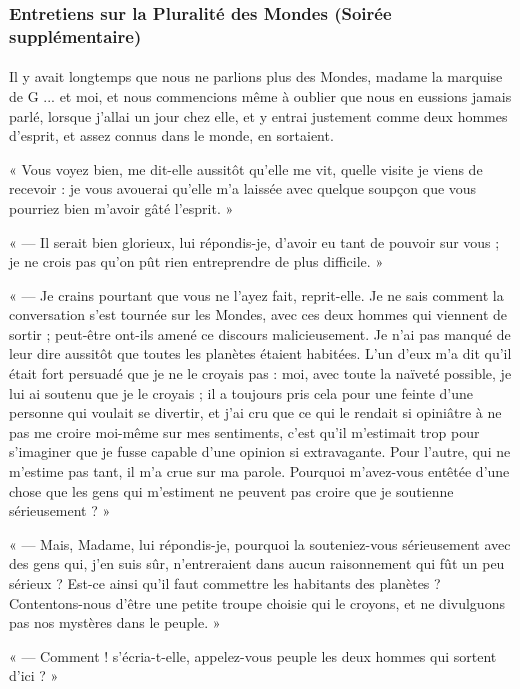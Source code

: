 \documentclass[a4paper, 11pt, oneside]{article}
\begin{document}
\subsubsection{Entretiens sur la Pluralité des Mondes (Soirée supplémentaire)}
\paragraph{}
Il y avait longtemps que nous ne parlions plus des Mondes, madame la marquise de G ... et moi, et nous commencions même à oublier que nous en eussions jamais parlé, lorsque j'allai un jour chez elle, et y entrai justement comme deux hommes d'esprit, et assez connus dans le monde, en sortaient.

« Vous voyez bien, me dit-elle aussitôt qu'elle me vit, quelle visite je viens de recevoir : je vous avouerai qu'elle m'a laissée avec quelque soupçon que vous pourriez bien m'avoir gâté l'esprit. »

« --- Il serait bien glorieux, lui répondis-je, d'avoir eu tant de pouvoir sur vous ; je ne crois pas qu'on pût rien entreprendre de plus difficile. »

« --- Je crains pourtant que vous ne l'ayez fait, reprit-elle. Je ne sais comment la conversation s'est tournée sur les Mondes, avec ces deux hommes qui viennent de sortir ; peut-être ont-ils amené ce discours malicieusement. Je n'ai pas manqué de leur dire aussitôt que toutes les planètes étaient habitées. L'un d'eux m'a dit qu'il était fort persuadé que je ne le croyais pas : moi, avec toute la naïveté possible, je lui ai soutenu que je le croyais ; il a toujours pris cela pour une feinte d'une personne qui voulait se divertir, et j'ai cru que ce qui le rendait si opiniâtre à ne pas me croire moi-même sur mes sentiments, c'est qu'il m'estimait trop pour s'imaginer que je fusse capable d'une opinion si extravagante. Pour l'autre, qui ne m'estime pas tant, il m'a crue sur ma parole. Pourquoi m'avez-vous entêtée d'une chose que les gens qui m'estiment ne peuvent pas croire que je soutienne sérieusement ? »

« --- Mais, Madame, lui répondis-je, pourquoi la souteniez-vous sérieusement avec des gens qui, j'en suis sûr, n'entreraient dans aucun raisonnement qui fût un peu sérieux ? Est-ce ainsi qu'il faut commettre les habitants des planètes ? Contentons-nous d'être une petite troupe choisie qui le croyons, et ne divulguons pas nos mystères dans le peuple. »

« --- Comment ! s'écria-t-elle, appelez-vous peuple les deux hommes qui sortent d'ici ? »
\end{document}
